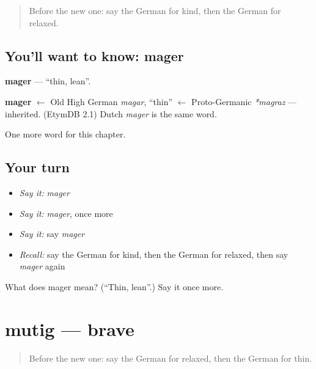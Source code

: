 \label{lesson:GE-C218-mager}



\begin{quote}
Before the new one: say the German for kind, then the German for relaxed.
\end{quote}

\subsection*{You'll want to know: mager}
\textbf{mager} — \textquotedblleft{}thin, lean\textquotedblright{}.

\begin{cousinweb}
\textbf{mager} $\leftarrow$ Old High German \emph{magar}, \textquotedblleft{}thin\textquotedblright{} $\leftarrow$ Proto-Germanic \emph{*magraz} — inherited. (EtymDB 2.1) Dutch \emph{mager} is the same word.
\end{cousinweb}

\begin{grammarlens}[title={What you've built}]
One more word for this chapter.
\end{grammarlens}

\subsection*{Your turn}
\begin{itemize}
\raggedright
  \item \emph{Say it:} \emph{mager}
  \item \emph{Say it:} \emph{mager}, once more
  \item \emph{Say it:} say \emph{mager}
  \item \emph{Recall:} say the German for kind, then the German for relaxed, then say \emph{mager} again
\end{itemize}

\begin{tcolorbox}[breakable,colback=teal!4,colframe=teal!35!black,title={Before you move on}]
What does mager mean? (\textquotedblleft{}Thin, lean\textquotedblright{}.) Say it once more.
\end{tcolorbox}
\section[mutig]{mutig — brave}

\label{lesson:GE-C218-mutig}



\begin{quote}
Before the new one: say the German for relaxed, then the German for thin.
\end{quote}

